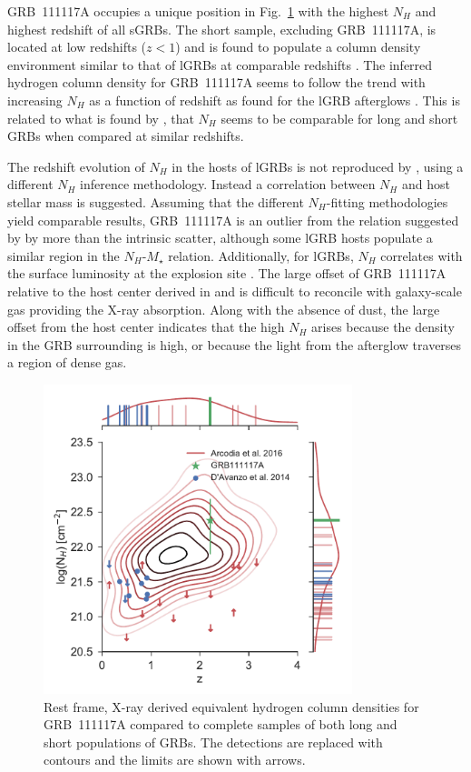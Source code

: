 \documentclass{aa}    %
\begin{document}
GRB~111117A occupies a unique position in Fig.~\ref{fig:NH_z} with the highest
$N_H$ and highest redshift of all sGRBs. The short sample, excluding
GRB~111117A, is located at low redshifts ($z < 1$) and is found to populate a
column density environment similar to that of lGRBs at comparable redshifts
\citep{DAvanzo2014a}. The inferred hydrogen column density for GRB~111117A seems
to follow the trend with increasing $N_H$ as a function of redshift as found for
the lGRB afterglows \citep{Campana2010, Starling2013, Arcodia2016}. This is
related to what is found by \citet{Kopac2012, Margutti2013}, that $N_H$ seems to
be comparable for long and short GRBs when compared at similar redshifts.

The redshift evolution of $N_H$ in the hosts of lGRBs is not reproduced by
\citet{Buchner2017}, using a different $N_H$ inference methodology. Instead a
correlation between $N_H$ and host stellar mass is suggested. Assuming that the
different $N_H$-fitting methodologies yield comparable results, GRB~111117A is
an outlier from the relation suggested by \citet{Buchner2017} by more than the
intrinsic scatter, although some lGRB hosts populate a similar region in the
$N_H$-$M_\star$ relation. Additionally, for lGRBs, $N_H$ correlates with the
surface luminosity at the explosion site \citep{Lyman2017}. The large offset of
GRB~111117A relative to the host center derived in \citet{Margutti2012} and
\citet{Sakamoto2013} is difficult to reconcile with galaxy-scale gas providing
the X-ray absorption. Along with the absence of dust, the large offset from the
host center indicates that the high $N_H$ arises because the density in the GRB
surrounding is high, or because the light from the afterglow traverses a region
of dense gas.

\begin{figure}
	\centering
	\includegraphics[width=9cm]{figures/NH_z.pdf}
	\caption{Rest frame, X-ray derived equivalent hydrogen column densities for GRB~111117A compared to complete samples of both long and short populations of GRBs. The detections are replaced with contours and the limits are shown with arrows.}
	\label{fig:NH_z}
\end{figure}
\end{document}
